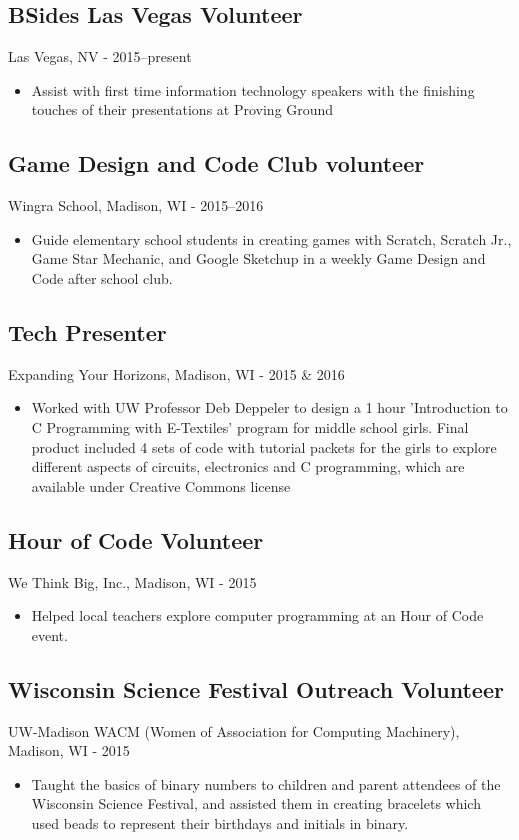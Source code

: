 \documentclass[../main.tex]{subfiles}
\begin{document}
\subsection*{BSides Las Vegas Volunteer}
Las Vegas, NV - 2015--present
	\begin{itemize}
	\item{Assist with first time information technology speakers with the finishing touches of their presentations at Proving Ground}
\end{itemize}

\subsection*{Game Design and Code Club volunteer}
     Wingra School, Madison, WI - 2015--2016
\begin{itemize}
		\item{Guide elementary school students in creating games with Scratch, Scratch Jr., Game Star Mechanic, and Google Sketchup in a weekly Game Design and Code after school club.}
	\end{itemize}

\subsection*{Tech Presenter}
     Expanding Your Horizons, Madison, WI - 2015 \& 2016
\begin{itemize}
		\item{Worked with UW Professor Deb Deppeler to design a 1 hour 'Introduction to C Programming with E-Textiles' program for middle school girls. Final product included 4 sets of code with tutorial packets for the girls to explore different aspects of circuits, electronics and C programming, which are available under Creative Commons license}
	\end{itemize}


\subsection*{Hour of Code Volunteer}
     We Think Big, Inc., Madison, WI - 2015
\begin{itemize}
		\item{Helped local teachers explore computer programming at an Hour of Code event.}
	\end{itemize}

\subsection*{Wisconsin Science Festival Outreach Volunteer}
UW-Madison WACM (Women of Association for Computing Machinery), Madison, WI - 2015
\begin{itemize}
		\item{Taught the basics of binary numbers to children and parent attendees of the Wisconsin Science Festival, and assisted them in creating bracelets which used beads to represent their birthdays and initials in binary.}
	\end{itemize}
\end{document}

